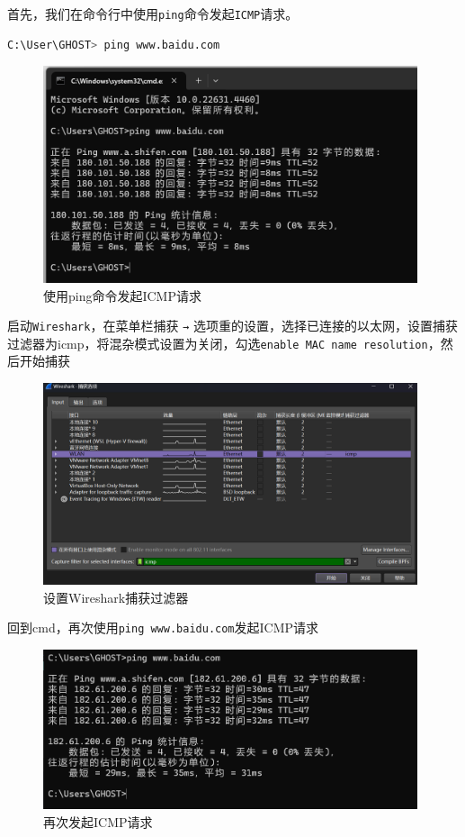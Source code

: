 \documentclass{article}
\begin{document}
	首先，我们在命令行中使用\texttt{ping}命令发起\texttt{ICMP}请求。
	
	\begin{lstlisting}[language=bash]
        C:\User\GHOST> ping www.baidu.com
	\end{lstlisting}
	
	\begin{figure}[H]
		\centering
		\includegraphics[width=11cm]{images/1.使用ping命令发起ICMP请求.jpg}
		\caption{使用ping命令发起ICMP请求}
	\end{figure}
	
	启动\texttt{Wireshark}，在菜单栏捕获 \texttt{→} 选项重的设置，选择已连接的以太网，设置捕获过滤器为icmp，将混杂模式设置为关闭，勾选\texttt{enable MAC name resolution}，然后开始捕获
	
	\begin{figure}[H]
		\centering
		\includegraphics[width=11cm]{images/2.设置Wireshark捕获过滤器.png}
		\caption{设置Wireshark捕获过滤器}
	\end{figure}
	
	回到cmd，再次使用\texttt{ping www.baidu.com}发起ICMP请求
	
	\begin{figure}[H]
		\centering
		\includegraphics[width=11cm]{images/3.再次发起ICMP请求.png}
		\caption{再次发起ICMP请求}
	\end{figure}
	
\end{document}
